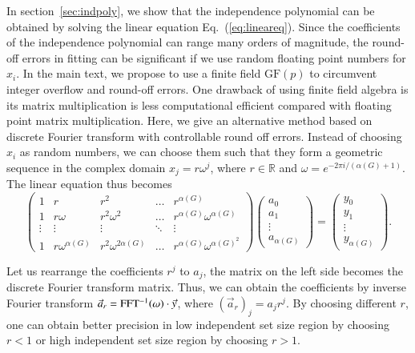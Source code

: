 \documentclass[onefignum, onetabnum]{siamart190516}
\newcommand{\<}{\langle}
\renewcommand{\>}{\rangle}
\newcommand{\Eq}[1]{Eq.~(\ref{#1})}
\begin{document}
In section~\ref{sec:indpoly}, we show that the independence polynomial can be obtained by solving the linear equation \Eq{eq:lineareq}.
Since the coefficients of the independence polynomial can range many orders of magnitude, the round-off errors in fitting can be significant if we use random floating point numbers for $x_{i}$.
In the main text, we propose to use a finite field $\text{GF}(p)$ to circumvent integer overflow and round-off errors.
One drawback of using finite field algebra is its matrix multiplication is less computational efficient compared with floating point matrix multiplication.
Here, we give an alternative method based on discrete Fourier transform with controllable round off errors.
Instead of choosing $x_{i}$ as random numbers, we can choose them such that they form a geometric sequence in the complex domain $x_j = r\omega^j$, where $r \in \mathbb{R}$ and $\omega = e^{-2\pi i/( \alpha(G)+1)}$. The linear equation thus becomes
\begin{equation}
\left(\begin{matrix}
1 & r & r^2 & \ldots & r^{\alpha(G)} \\
1 & r\omega & r^2\omega^2 & \ldots & r^{\alpha(G)} \omega^{\alpha(G)} \\
\vdots & \vdots & \vdots &\ddots & \vdots \\
1 & r\omega^{\alpha(G)} & r^2\omega^{2{\alpha(G)}} & \ldots & r^{\alpha(G)}\omega^{{\alpha(G)}^2}
\end{matrix}\right)
\left(\begin{matrix}
a_0 \\ a_1 \\ \vdots \\ a_{\alpha(G)}
\end{matrix}\right)
= \left(\begin{matrix}
y_0 \\ y_1 \\ \vdots \\ y_{\alpha(G)}
\end{matrix}\right).
\end{equation}

Let us rearrange the coefficients $r^j$ to $a_j$, the matrix on the left side becomes the discrete Fourier transform matrix. Thus, we can obtain the coefficients by inverse Fourier transform $\vec a_r = {\rm FFT^{-1}}(\omega) \cdot \vec y$, where $(\vec a_r)_j = a_j r ^j$.
By choosing different $r$, one can obtain better precision in low independent set size region by choosing $r<1$ or high independent set size region by choosing $r>1$.
\end{document}
